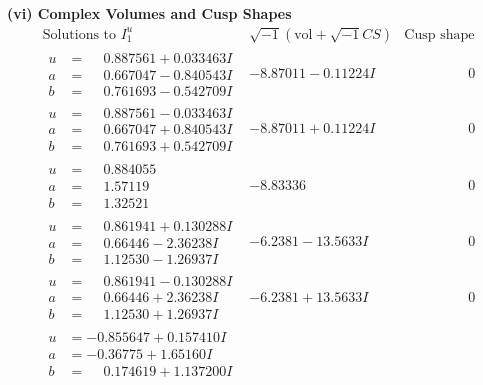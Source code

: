 \documentclass[1p]{elsarticle_modified}
\theoremstyle{definition}
\newcommand{\I}{\sqrt{-1}}
\begin{document}
\newpage\flushleft \textbf{(vi) Complex Volumes and Cusp Shapes}
$$\begin{array}{c|c|c}  
\text{Solutions to }I^u_{1}& \I (\text{vol} + \sqrt{-1}CS) & \text{Cusp shape}\\
 \hline 
\begin{aligned}
u &= \phantom{-}0.887561 + 0.033463 I \\
a &= \phantom{-}0.667047 - 0.840543 I \\
b &= \phantom{-}0.761693 - 0.542709 I\end{aligned}
 & -8.87011 - 0.11224 I & \phantom{-0.000000 } 0 \\ \hline\begin{aligned}
u &= \phantom{-}0.887561 - 0.033463 I \\
a &= \phantom{-}0.667047 + 0.840543 I \\
b &= \phantom{-}0.761693 + 0.542709 I\end{aligned}
 & -8.87011 + 0.11224 I & \phantom{-0.000000 } 0 \\ \hline\begin{aligned}
u &= \phantom{-}0.884055\phantom{ +0.000000I} \\
a &= \phantom{-}1.57119\phantom{ +0.000000I} \\
b &= \phantom{-}1.32521\phantom{ +0.000000I}\end{aligned}
 & -8.83336\phantom{ +0.000000I} & \phantom{-0.000000 } 0 \\ \hline\begin{aligned}
u &= \phantom{-}0.861941 + 0.130288 I \\
a &= \phantom{-}0.66446 - 2.36238 I \\
b &= \phantom{-}1.12530 - 1.26937 I\end{aligned}
 & -6.2381 - 13.5633 I & \phantom{-0.000000 } 0 \\ \hline\begin{aligned}
u &= \phantom{-}0.861941 - 0.130288 I \\
a &= \phantom{-}0.66446 + 2.36238 I \\
b &= \phantom{-}1.12530 + 1.26937 I\end{aligned}
 & -6.2381 + 13.5633 I & \phantom{-0.000000 } 0 \\ \hline\begin{aligned}
u &= -0.855647 + 0.157410 I \\
a &= -0.36775 + 1.65160 I \\
b &= \phantom{-}0.174619 + 1.137200 I\end{aligned}

\end{array}$$
\end{document}
